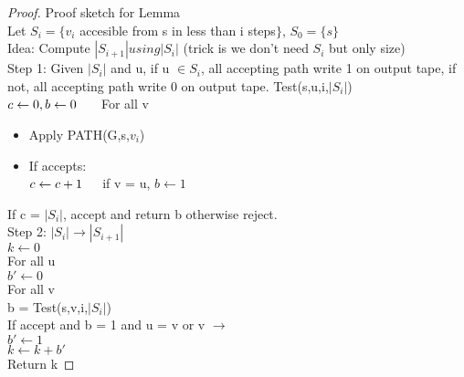 \documentclass{article}
\theoremstyle{definition}
\theoremstyle{remark}
\newcommand{\Proof}[1]{\begin{proof}#1\end{proof}}
\begin{document}
\Proof{Proof sketch for Lemma\\
	Let $S_i = \{v_i$ accesible from s in less than i steps$\}$, $S_0 = \{s\}$\\
	Idea: Compute $|S_{i+1}| using |S_i|$ (trick is we don't need $S_i$ but only size)\\
	
	Step 1: Given $|S_i|$ and u, if u $\in S_i$, all accepting path write 1 on output tape, if not, all accepting path write 0 on output tape.
	\newpage
	Test(s,u,i,$|S_i|$)\\
	\indent $c \leftarrow 0,b \leftarrow 0\\
	\indent$ For all v\begin{itemize}
		\item Apply PATH(G,s,$v_i$)
		\item If accepts:\\
		\indent $c \leftarrow c+1\\
		\indent $if v = u, $b \leftarrow 1$
	\end{itemize}
	If c = $|S_i|$, accept and return b otherwise reject.\\
	
	Step 2: $|S_i| \rightarrow |S_{i+1}|$\\
	$k \leftarrow 0$\\
	For all u\\
	\indent $b'\leftarrow0$\\
	\indent For all v\\
	\indent\indent b = Test(s,v,i,$|S_i|$)\\
	\indent\indent If accept and b = 1 and u = v or v $\rightarrow$\\
	\indent\indent\indent $b' \leftarrow 1$\\
	\indent $k \leftarrow k + b'$\\
	Return k
	}
\end{document}
